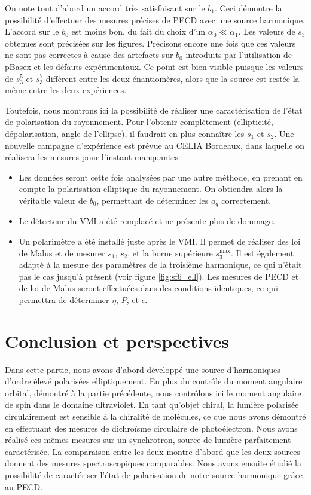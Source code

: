On note tout d'abord un accord très satisfaisant sur le $b_1$. Ceci démontre la possibilité d'effectuer des mesures précises de PECD avec une source harmonique. L'accord sur le $b_0$ est moins bon, du fait du choix d'un $\alpha_0\ll\alpha_1$. Les valeurs de $s_3$ obtenues sont précisées sur les figures. Précisons encore une fois que ces valeurs ne sont pas correctes à cause des artefacts sur $b_0$ introduits par l'utilisation de pBasex et les défauts expérimentaux. Ce point est bien visible puisque les valeurs de $s_3^5$ et $s_3^7$ diffèrent entre les deux énantiomères, alors que la source est restée la même entre les deux expériences.\par
Toutefois, nous montrons ici la possibilité de réaliser une caractérisation de l'état de polarisation du rayonnement. Pour l'obtenir complètement (ellipticité, dépolarisation, angle de l'ellipse), il faudrait en plus connaître les $s_1$ et $s_2$. Une nouvelle campagne d'expérience est prévue au CELIA Bordeaux, dans laquelle on réalisera les mesures pour l'instant manquantes :


\begin{itemize}
\renewcommand{\labelitemi}{$\bullet$}
\setlength\itemsep{1em}
\item Les données seront cette fois analysées par une autre méthode, en prenant en compte la polarisation elliptique du rayonnement. On obtiendra alors la véritable valeur de $b_0$, permettant de déterminer les $a_q$ correctement.
\item Le détecteur du VMI a été remplacé et ne présente plus de dommage.
\item Un polarimètre a été installé juste après le VMI. Il permet de réaliser des loi de Malus et de mesurer $s_1$, $s_2$, et la borne supérieure $s_3^{\text{max}}$. Il est également adapté à la mesure des paramètres de la troisième harmonique, ce qui n'était pas le cas jusqu'à présent (voir figure \ref{fig:sf6_ell}). Les mesures de PECD et de loi de Malus seront effectuées dans des conditions identiques, ce qui permettra de déterminer $\eta$, $P$, et $\epsilon$. 
\end{itemize}

\section*{Conclusion et perspectives}
Dans cette partie, nous avons d'abord développé une source d'harmoniques d'ordre élevé polarisées elliptiquement. En plus du contrôle du moment angulaire orbital, démontré à la partie précédente, nous contrôlons ici le moment angulaire de spin dans le domaine ultraviolet. En tant qu'objet chiral, la lumière polarisée circulairement est sensible à la chiralité de molécules, ce que nous avons démontré en effectuant des mesures de dichroïsme circulaire de photoélectron. Nous avons réalisé ces mêmes mesures sur un synchrotron, source de lumière parfaitement caractérisée. La comparaison entre les deux montre d'abord que les deux sources donnent des mesures spectroscopiques comparables. Nous avons ensuite étudié la possibilité de caractériser l'état de polarisation de notre source harmonique grâce au PECD.
